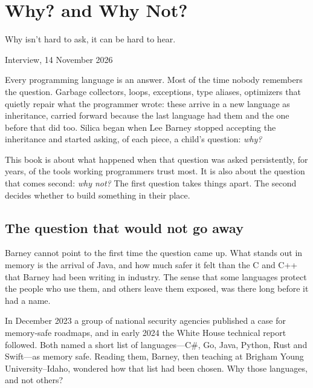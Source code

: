 \chapter{Why? and Why Not?}
\label{ch:why}

\epigraph{Why isn't hard to ask, it can be hard to hear.}{Interview, 14 November 2026}

Every programming language is an answer. Most of the time nobody remembers
the question. Garbage collectors, loops, exceptions, type aliases, optimizers
that quietly repair what the programmer wrote: these arrive in a new language
as inheritance, carried forward because the last language had them and the one
before that did too. Silica began when Lee Barney stopped accepting the
inheritance and started asking, of each piece, a child's question: \emph{why?}

This book is about what happened when that question was asked persistently,
for years, of the tools working programmers trust most. It is also about the
question that comes second: \emph{why not?} The first
question takes things apart. The second decides whether to build something in
their place.

\section{The question that would not go away}

Barney cannot point to the first time the question came up. What stands out in
memory is the arrival of Java, and how much safer it felt than the C and C++
that Barney had been writing in industry. The sense that some languages protect
the people who use them, and others leave them exposed, was there long before
it had a name.

In December 2023 a group of national security agencies published a case for
memory-safe roadmaps, and in early 2024 the White House technical report
followed. Both named a short list of languages---C\#, Go, Java, Python, Rust and
Swift---as memory safe. Reading them, Barney, then teaching at Brigham Young
University--Idaho, wondered how that list had been chosen. Why those languages,
and not others?

